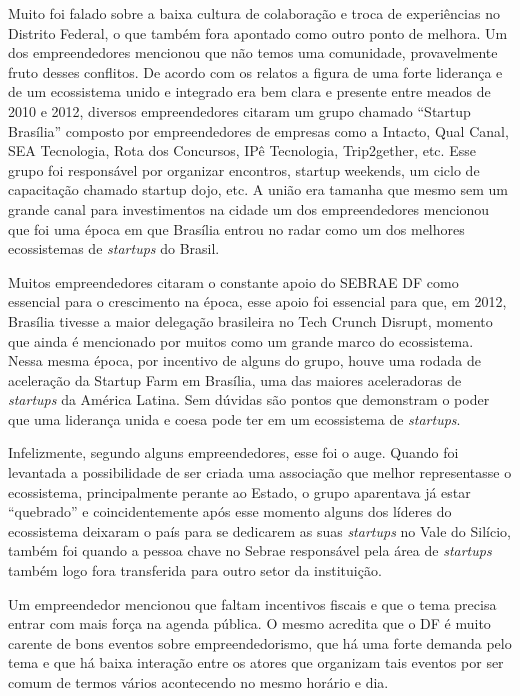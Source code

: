 Muito foi falado sobre a baixa cultura de colaboração e troca de experiências no Distrito Federal, o que também fora apontado como outro ponto de melhora. Um dos empreendedores mencionou que não temos uma comunidade, provavelmente fruto desses conflitos. De acordo com os relatos a figura de uma forte liderança e de um ecossistema unido e integrado era bem clara e presente entre meados de 2010 e 2012, diversos empreendedores citaram um grupo chamado ``Startup Brasília'' composto por empreendedores de empresas como a Intacto, Qual Canal, SEA Tecnologia, Rota dos Concursos, IPê Tecnologia, Trip2gether, etc. Esse grupo foi responsável por organizar encontros, startup weekends, um ciclo de capacitação chamado startup dojo, etc. A união era tamanha que mesmo sem um grande canal para investimentos na cidade um dos empreendedores mencionou que foi uma época em que Brasília entrou no radar como um dos melhores ecossistemas de \textit{startups} do Brasil. 

Muitos empreendedores citaram o constante apoio do SEBRAE DF como essencial para o crescimento na época, esse apoio foi essencial para que, em 2012, Brasília tivesse a maior delegação brasileira no Tech Crunch Disrupt, momento que ainda é mencionado por muitos como um grande marco do ecossistema. Nessa mesma época, por incentivo de alguns do grupo, houve uma rodada de aceleração da Startup Farm em Brasília, uma das maiores aceleradoras de \textit{startups} da América Latina. Sem dúvidas são pontos que demonstram o poder que uma liderança unida e coesa pode ter em um ecossistema de \textit{startups}. 

Infelizmente, segundo alguns empreendedores, esse foi o auge. Quando foi levantada a possibilidade de ser criada uma associação que melhor representasse o ecossistema, principalmente perante ao Estado, o grupo aparentava já estar ``quebrado'' e coincidentemente após esse momento alguns dos líderes do ecossistema deixaram o país para se dedicarem as suas \textit{startups} no Vale do Silício, também foi quando a pessoa chave no Sebrae responsável pela área de \textit{startups} também logo fora transferida para outro setor da instituição.

Um empreendedor mencionou que faltam incentivos fiscais e que o tema precisa entrar com mais força na agenda pública. O mesmo acredita que o DF é muito carente de bons eventos sobre empreendedorismo, que há uma forte demanda pelo tema e que há baixa interação entre os atores que organizam tais eventos por ser comum de termos vários acontecendo no mesmo horário e dia. 

